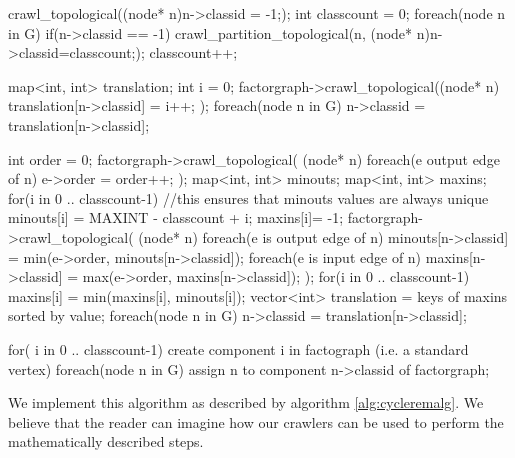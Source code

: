 \FloatBarrier

\mybeginfigloose
\begin{code}
crawl_topological((node* n){n->classid = -1;});
int classcount = 0;
foreach(node n in G)
  if(n->classid == -1)
  {
    crawl_partition_topological(n, (node* n){n->classid=classcount;});
    classcount++;
  }
\end{code}

\mybeginfigloose
\begin{code}
map<int, int> translation;
int i = 0;
factorgraph->crawl_topological((node* n){
  translation[n->classid] = i++;
});
foreach(node n in G)
  n->classid = translation[n->classid];
\end{code}

\mybeginfigloose
\begin{code}
int order = 0;
factorgraph->crawl_topological(
  (node* n){ 
    foreach(e output edge of n) 
      e->order = order++;
  }
);
map<int, int> minouts;
map<int, int> maxins;
for(i in 0 .. classcount-1) 
{
  //this ensures that minouts values are always unique
  minouts[i] = MAXINT - classcount + i;
  maxins[i]= -1;
} 
factorgraph->crawl_topological(
  (node* n){
    foreach(e is output edge of n)
      minouts[n->classid] = min(e->order, minouts[n->classid]);
    foreach(e is input edge of n)
      maxins[n->classid] = max(e->order, maxins[n->classid]);
  }
); 
for(i in 0 .. classcount-1)
  maxins[i] = min(maxins[i], minouts[i]);
vector<int> translation = keys of maxins sorted by value;
foreach(node n in G)
  n->classid = translation[n->classid];
\end{code}

\mybeginfigloose
\begin{code}
for( i in 0 .. classcount-1)
  create component i in factograph (i.e. a standard vertex)
foreach(node n in G)
  assign n to component n->classid of factorgraph;
\end{code}

\FloatBarrier


We implement this algorithm as described by algorithm \ref{alg:cycleremalg}. We believe that the reader can imagine how our crawlers can be used to perform the mathematically described steps.

